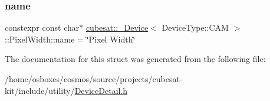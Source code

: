 \subsubsection{\texorpdfstring{name}{name}}
{\footnotesize\ttfamily constexpr const char$\ast$ \hyperlink{structcubesat_1_1__Device}{cubesat\+::\+\_\+\+Device}$<$ Device\+Type\+::\+C\+AM $>$\+::Pixel\+Width\+::name = \char`\"{}Pixel Width\char`\"{}\hspace{0.3cm}{\ttfamily [static]}}



The documentation for this struct was generated from the following file\+:\begin{DoxyCompactItemize}
\item 
/home/osboxes/cosmos/source/projects/cubesat-\/kit/include/utility/\hyperlink{DeviceDetail_8h}{Device\+Detail.\+h}\end{DoxyCompactItemize}
